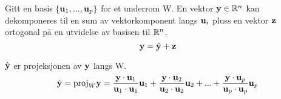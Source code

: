 Gitt en basis $\{ \mathbf{u}_1, ..., \mathbf{u}_p \}$ for et underrom W.
En vektor $\mathbf{y}\in\mathbb{R}^n$ kan dekomponeres til en sum av vektorkomponent
langs $\mathbf{u}_i$ pluss en vektor $\mathbf{z}$ ortogonal på
en utvidelse av basisen til $\mathbb{R}^n$.
$$\mathbf{y} = \hat{\mathbf{y}} + \mathbf{z}$$

$\hat{\mathbf{y}}$ er projeksjonen av $\mathbf{y}$ langs W.
$$\hat{\mathbf{y}} = \text{proj}_W\mathbf{y}
  = \frac{\mathbf{y}\cdot\mathbf{u}_1}{\mathbf{u}_1\cdot\mathbf{u}_1}\mathbf{u}_1
    + \frac{\mathbf{y}\cdot\mathbf{u}_2}{\mathbf{u}_2\cdot\mathbf{u}_2}\mathbf{u}_2
    + ...
    + \frac{\mathbf{y}\cdot\mathbf{u}_p}{\mathbf{u}_p\cdot\mathbf{u}_p}\mathbf{u}_p$$
